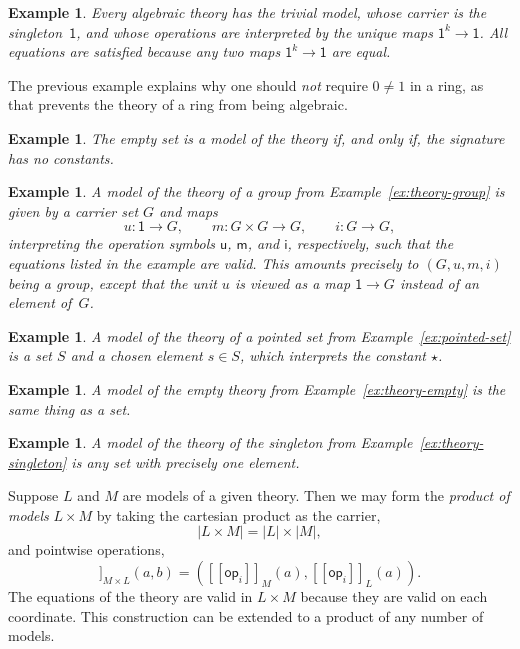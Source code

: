 \documentclass{amsart}
\newcommand{\op}{\mathsf{op}}
\newcommand{\one}{\mathsf{1}}
\newcommand{\sem}[1]{[\![#1]\!]}
\newtheorem{example}[definition]{Example}
\begin{document}
\begin{example}
  Every algebraic theory has the \emph{trivial model}, whose carrier is the
  singleton~$\one$, and whose operations are interpreted by the unique maps
  $\one^k \to \one$. All equations are satisfied because any two maps $\one^k \to \one$
  are equal.
\end{example}

The previous example explains why one should \emph{not} require $0 \neq 1$ in a ring, as
that prevents the theory of a ring from being algebraic.

\begin{example}
  The empty set is a model of the theory if, and only if, the signature has no constants.
\end{example}

\begin{example}
  A model of the theory of a group from Example~\ref{ex:theory-group} is given by a
  carrier set $G$ and maps
  \begin{equation*}
    u : \one \to G,\qquad
    m : G \times G \to G,\qquad
    i : G \to G,
  \end{equation*}
  interpreting the operation symbols $\mathsf{u}$, $\mathsf{m}$, and $\mathsf{i}$,
  respectively, such that the equations listed in the example are valid. This amounts
  precisely to $(G, u, m, i)$ being a group, except that the unit $u$ is viewed as a map
  $\one \to G$ instead of an element of~$G$.
\end{example}

\begin{example}
  A model of the theory of a pointed set from Example~\ref{ex:pointed-set} is a set $S$
  and a chosen element $s \in S$, which interprets the constant $\star$.
\end{example}

\begin{example}
  A model of the empty theory from Example~\ref{ex:theory-empty} is the same thing as a
  set.
\end{example}

\begin{example}
  A model of the theory of the singleton from Example~\ref{ex:theory-singleton} is any
  set with precisely one element.
\end{example}

Suppose $L$ and $M$ are models of a given theory. Then we may form the \emph{product of
  models} $L \times M$ by taking the cartesian product as the carrier,
%
\begin{equation*}
  |L \times M| = |L| \times |M|,
\end{equation*}
%
and pointwise operations,
%
\begin{equation*}
  \sem{\op_i}_{M \times L}(a, b) = (\sem{\op_i}_M(a), \sem{\op_i}_L(a)).
\end{equation*}
%
The equations of the theory are valid in $L \times M$ because they are valid on each
coordinate. This construction can be extended to a product of any number of models.
\end{document}
